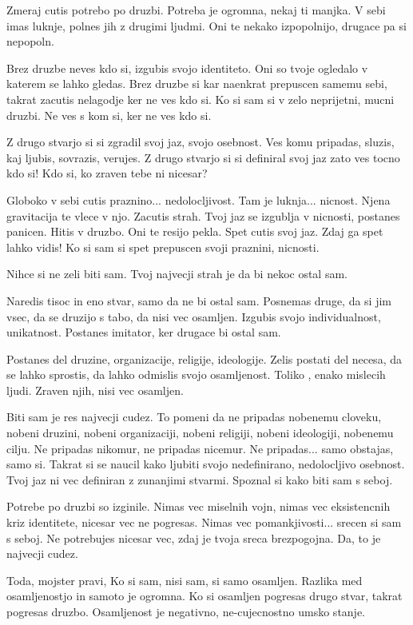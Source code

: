         

   Zmeraj cutis potrebo po druzbi. Potreba je ogromna, nekaj ti manjka. V sebi imas luknje, polnes jih z drugimi ljudmi. Oni te nekako izpopolnijo, drugace pa si nepopoln. 

Brez druzbe neves kdo si, izgubis svojo identiteto. Oni so tvoje ogledalo v katerem se lahko gledas. Brez druzbe si kar naenkrat prepuscen samemu sebi, takrat zacutis nelagodje ker ne ves kdo si. Ko si sam si v zelo neprijetni, mucni druzbi. Ne ves s kom si, ker ne ves kdo si. 

Z drugo stvarjo si si zgradil svoj jaz, svojo osebnost. Ves komu pripadas, sluzis, kaj ljubis, sovrazis, verujes. Z drugo stvarjo si si definiral svoj jaz zato ves tocno kdo si! Kdo si, ko zraven tebe ni nicesar? 

Globoko v sebi cutis praznino... nedolocljivost. Tam je luknja... nicnost. Njena gravitacija te vlece v njo. Zacutis strah. Tvoj jaz se izgublja v nicnosti, postanes panicen. Hitis v druzbo. Oni te resijo pekla. Spet cutis svoj jaz. Zdaj ga spet lahko vidis! Ko si sam si spet prepuscen svoji praznini, nicnosti. 

Nihce si ne zeli biti sam. Tvoj najvecji strah je da bi nekoc ostal sam. 

Naredis tisoc in eno stvar, samo da ne bi ostal sam. Posnemas druge, da si jim vsec, da se druzijo s tabo, da nisi vec osamljen. Izgubis svojo individualnost, unikatnost. Postanes imitator, ker drugace bi ostal sam. 

Postanes del druzine, organizacije, religije, ideologije. Zelis postati del necesa, da se lahko sprostis, da lahko odmislis svojo osamljenost. Toliko , enako mislecih ljudi. Zraven njih, nisi vec osamljen. 

Biti sam je res najvecji cudez. To pomeni da ne pripadas nobenemu cloveku, nobeni druzini, nobeni organizaciji, nobeni religiji, nobeni ideologiji, nobenemu cilju. Ne pripadas nikomur, ne pripadas nicemur. Ne pripadas... samo obstajas, samo si. Takrat si se naucil kako ljubiti svojo nedefinirano, nedolocljivo osebnost. Tvoj jaz ni vec definiran z zunanjimi stvarmi. Spoznal si kako biti sam s seboj. 

Potrebe po druzbi so izginile. Nimas vec miselnih vojn, nimas vec eksistencnih kriz identitete, nicesar vec ne pogresas. Nimas vec pomankjivosti... srecen si sam s seboj. Ne potrebujes nicesar vec, zdaj je tvoja sreca brezpogojna. Da, to je najvecji cudez. 

Toda, mojster pravi,  Ko si sam, nisi sam, si samo osamljen. Razlika med osamljenostjo in samoto je ogromna. Ko si osamljen pogresas drugo stvar, takrat pogresas druzbo. Osamljenost je negativno, ne-cujecnostno umsko stanje. 

